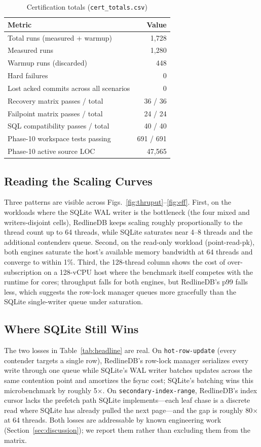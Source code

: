 \begin{table}[t]
\centering
\caption{Certification totals (\texttt{cert\_totals.csv})}
\label{tab:cert}
\renewcommand{\arraystretch}{1.05}
\begin{tabular}{@{}lr@{}}
\toprule
\textbf{Metric} & \textbf{Value} \\
\midrule
Total runs (measured + warmup) & 1{,}728 \\
Measured runs & 1{,}280 \\
Warmup runs (discarded) & 448 \\
Hard failures & 0 \\
Lost acked commits across all scenarios & 0 \\
Recovery matrix passes / total & 36 / 36 \\
Failpoint matrix passes / total & 24 / 24 \\
SQL compatibility passes / total & 40 / 40 \\
Phase-10 workspace tests passing & 691 / 691 \\
Phase-10 active source LOC & 47{,}565 \\
\bottomrule
\end{tabular}
\end{table}

\subsection{Reading the Scaling Curves}
Three patterns are visible across Figs.~\ref{fig:thruput}--\ref{fig:eff}.
First, on the workloads where the SQLite WAL writer is the
bottleneck (the four mixed and writers-disjoint cells), RedlineDB
keeps scaling roughly proportionally to the thread count up to 64
threads, while SQLite saturates near 4--8 threads and the additional
contenders queue. Second, on the read-only workload (point-read-pk),
both engines saturate the host's available memory bandwidth at 64
threads and converge to within 1\%. Third, the 128-thread column
shows the cost of over-subscription on a 128-vCPU host where the
benchmark itself competes with the runtime for cores; throughput
falls for both engines, but RedlineDB's p99 falls less, which
suggests the row-lock manager queues more gracefully than the
SQLite single-writer queue under saturation.

\subsection{Where SQLite Still Wins}
The two losses in Table~\ref{tab:headline} are real. On
\texttt{hot-row-update} (every contender targets a single row),
RedlineDB's row-lock manager serializes every write through one
queue while SQLite's WAL writer batches updates across the same
contention point and amortizes the fsync cost; SQLite's batching wins
this microbenchmark by roughly 5$\times$.
On \texttt{secondary-index-range}, RedlineDB's index cursor lacks
the prefetch path SQLite implements---each leaf chase is a discrete
read where SQLite has already pulled the next page---and the gap is
roughly 80$\times$ at 64 threads. Both losses are addressable by
known engineering work (Section~\ref{sec:discussion}); we report
them rather than excluding them from the matrix.
